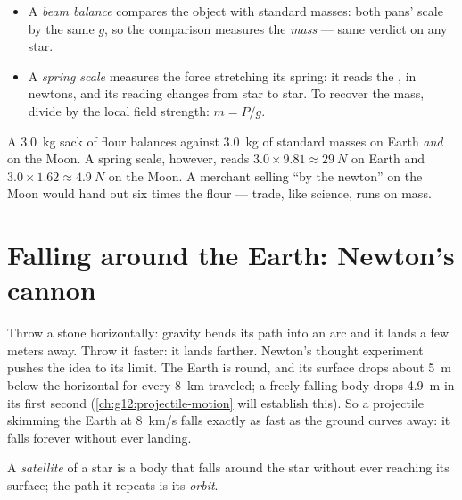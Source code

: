 \begin{method}\label{met:g10:universal-gravitation:instruments}
\begin{itemize}
  \item A \emph{beam balance} compares the object with standard masses:
        both pans'  scale by the same $g$, so the comparison
        measures the \emph{mass} --- same verdict on any star.
  \item A \emph{spring scale} measures the force stretching its spring:
        it reads the \emph{}, in newtons, and its reading changes
        from star to star. To recover the mass, divide by the local
        field strength: $m = P/g$.
\end{itemize}
\end{method}

\begin{example}\label{ex:g10:universal-gravitation:flour}
A \qty{3.0}{kg} sack of flour balances against \qty{3.0}{kg} of standard
masses on Earth \emph{and} on the Moon. A spring scale, however, reads
$3.0 \times 9.81 \approx \qty{29}{N}$ on Earth and
$3.0 \times 1.62 \approx \qty{4.9}{N}$ on the Moon. A merchant selling
``by the newton'' on the Moon would hand out six times the flour ---
trade, like science, runs on mass.
\end{example}

\section{Falling around the Earth: Newton's cannon}

Throw a stone horizontally: gravity bends its path into an arc and it
lands a few meters away. Throw it faster: it lands farther. Newton's
thought experiment pushes the idea to its limit. The Earth is round, and
its surface drops about \qty{5}{m} below the horizontal for every
\qty{8}{km} traveled; a freely falling body drops \qty{4.9}{m} in its
first second (\cref{ch:g12:projectile-motion} will establish this). So a
projectile skimming the Earth at \qty{8}{km/s} falls exactly as fast as
the ground curves away: it falls forever without ever landing.

\begin{definition}\label{def:g10:universal-gravitation:satellite}
A \emph{satellite} of a star is a body that falls
around the star without ever reaching its surface; the path it repeats
is its \emph{orbit}.
\end{definition}

